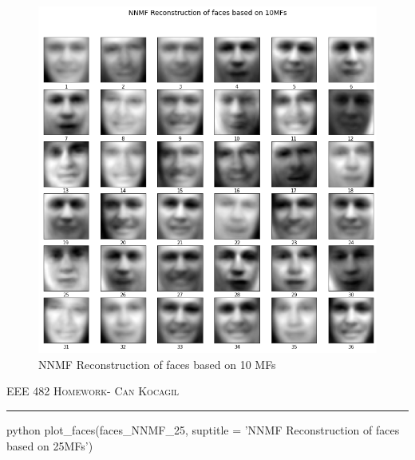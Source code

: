 \documentclass[12pt]{amsart}
\begin{document}
\begin{figure}[h]
    \centering
        \includegraphics[width = 1\textwidth]{images/Q1/NNMF Reconstruction of faces based on 10MFs.png}
        \caption{NNMF Reconstruction of faces based on 10 MFs}
\end{figure}

\newpage
{\scshape EEE 482} \hfill {\scshape \large  Homework-\relax} \hfill {\scshape Can Kocagil}
\smallskip
\hrule
\vspace{2mm}

\begin{mintedbox}{python}
plot_faces(faces_NNMF_25, suptitle = 'NNMF Reconstruction of faces based on 25MFs')
\end{mintedbox}
\end{document}
